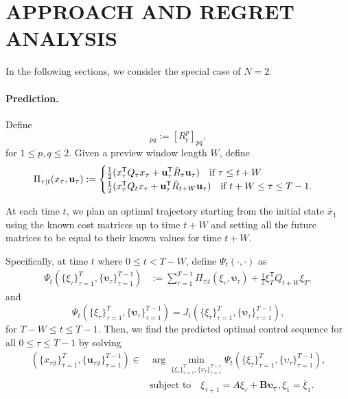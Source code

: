 \documentclass{article}
\newcommand{\transpose}{\mathsf{T}}
\begin{document}
\section{APPROACH AND REGRET ANALYSIS}
In the following sections, we consider the special case of $N = 2$. 
\paragraph{Prediction. } 
Define
\begin{equation}
    [\bar{R}_{t}]_{pq} := [R_{t}^{p}]_{pq},
\end{equation}
for $1 \leq p,q \leq 2$. Given a preview window length $W$, define
\begin{equation}
\begin{split}
    \Pi_{\tau|t}(x_{\tau},\mathbf{u}_{\tau}) := 
    \begin{cases}
        \frac{1}{2} (x_{\tau}^{\transpose}Q_{\tau}x_{\tau} +  \mathbf{u}_{\tau}^{\transpose}\bar{R}_{\tau}\mathbf{u}_{\tau}) \text{\quad if $\tau \leq t+W$}\\
        \frac{1}{2} (x_{\tau}^{\transpose}Q_{t}x_{\tau} + \mathbf{u}_{\tau}^{\transpose}\bar{R}_{t+W}\mathbf{u}_{\tau}) \text{\quad if $t+W \leq \tau \leq T-1$}.
    \end{cases}
\end{split}
\end{equation}

At each time $t$, we plan an optimal trajectory starting from the initial state $\bar{x}_{1}$ using the known cost matrices up to time $t+W$ and setting all the future matrices to be equal to their known values for time $t+W$.

Specifically, at time $t$ where $0\leq t < T-W$, define $\Psi_{t}(\cdot,\cdot)$ as
\begin{align}
\Psi_{t}(\{\xi_{\tau}\}_{\tau=1}^{T},\{\boldsymbol{\upsilon}_{\tau}\}_{\tau=1}^{T-1}) &:= \sum_{\tau=1}^{T-1} \Pi_{\tau|t}(\xi_{\tau},\boldsymbol{\upsilon}_{\tau}) + \frac{1}{2} \xi_{T}^{\transpose}Q_{t+W}\xi_{T},
\end{align}
and 
\begin{equation}
    \Psi_{t}(\{\xi_{\tau}\}_{\tau=1}^{T},\{\boldsymbol{\upsilon}_{\tau}\}_{\tau=1}^{T-1}) = J_{t}(\{\xi_{\tau}\}_{\tau=1}^{T},\{\boldsymbol{\upsilon}_{\tau}\}_{\tau=1}^{T-1}),
\end{equation}
for $T-W \leq t \leq T-1$.
Then, we find the predicted optimal control sequence for all $0\leq \tau\leq T-1$ by solving
\begin{equation}
\begin{split}
    (\{x_{\tau|t}\}_{\tau=1}^{T}, \{\mathbf{u}_{\tau|t}\}_{\tau=1}^{T-1}) \in &\arg\min_{\{\xi_{\tau}\}_{\tau=1}^{T},\{\upsilon_{\tau}\}_{\tau=1}^{T-1}} \Psi_{t}(\{\xi_{\tau}\}_{\tau=1}^{T},\{\upsilon_{\tau}\}_{\tau=1}^{T-1}),\\
    &\text{subject to}\quad \xi_{\tau+1} = A\xi_{\tau} + \mathbf{B}\mathbf{\upsilon_{\tau}}, \xi_{1} = \bar{\xi}_{1}.
\end{split}
\end{equation}
\end{document}
